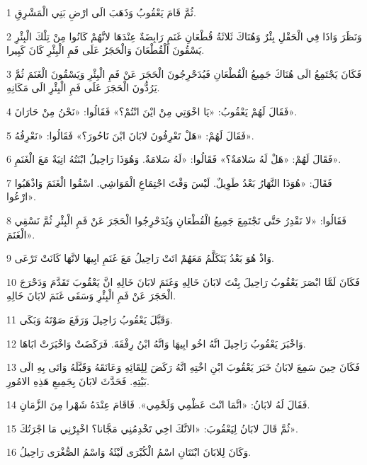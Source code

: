 \par 1 ثُمَّ قَامَ يَعْقُوبُ وَذَهَبَ الَى ارْضِ بَنِي الْمَشْرِقِ.
\par 2 وَنَظَرَ وَاذَا فِي الْحَقْلِ بِئْرٌ وَهُنَاكَ ثَلاثَةُ قُطْعَانِ غَنَمٍ رَابِضَةٌ عِنْدَهَا لانَّهُمْ كَانُوا مِنْ تِلْكَ الْبِئْرِ يَسْقُونَ الْقُطْعَانَ وَالْحَجَرُ عَلَى فَمِ الْبِئْرِ كَانَ كَبِيرا.
\par 3 فَكَانَ يَجْتَمِعُ الَى هُنَاكَ جَمِيعُ الْقُطْعَانِ فَيُدَحْرِجُونَ الْحَجَرَ عَنْ فَمِ الْبِئْرِ وَيَسْقُونَ الْغَنَمَ ثُمَّ يَرُدُّونَ الْحَجَرَ عَلَى فَمِ الْبِئْرِ الَى مَكَانِهِ.
\par 4 فَقَالَ لَهُمْ يَعْقُوبُ: «يَا اخْوَتِي مِنْ ايْنَ انْتُمْ؟» فَقَالُوا: «نَحْنُ مِنْ حَارَانَ».
\par 5 فَقَالَ لَهُمْ: «هَلْ تَعْرِفُونَ لابَانَ ابْنَ نَاحُورَ؟» فَقَالُوا: «نَعْرِفُهُ».
\par 6 فَقَالَ لَهُمْ: «هَلْ لَهُ سَلامَةٌ؟» فَقَالُوا: «لَهُ سَلامَةٌ. وَهُوَذَا رَاحِيلُ ابْنَتُهُ اتِيَةٌ مَعَ الْغَنَمِ».
\par 7 فَقَالَ: «هُوَذَا النَّهَارُ بَعْدُ طَوِيلٌ. لَيْسَ وَقْتَ اجْتِمَاعِ الْمَوَاشِي. اسْقُوا الْغَنَمَ وَاذْهَبُوا ارْعُوا».
\par 8 فَقَالُوا: «لا نَقْدِرُ حَتَّى تَجْتَمِعَ جَمِيعُ الْقُطْعَانِ وَيُدَحْرِجُوا الْحَجَرَ عَنْ فَمِ الْبِئْرِ ثُمَّ نَسْقِي الْغَنَمَ».
\par 9 وَاذْ هُوَ بَعْدُ يَتَكَلَّمُ مَعَهُمْ اتَتْ رَاحِيلُ مَعَ غَنَمِ ابِيهَا لانَّهَا كَانَتْ تَرْعَى.
\par 10 فَكَانَ لَمَّا ابْصَرَ يَعْقُوبُ رَاحِيلَ بِنْتَ لابَانَ خَالِهِ وَغَنَمَ لابَانَ خَالِهِ انَّ يَعْقُوبَ تَقَدَّمَ وَدَحْرَجَ الْحَجَرَ عَنْ فَمِ الْبِئْرِ وَسَقَى غَنَمَ لابَانَ خَالِهِ.
\par 11 وَقَبَّلَ يَعْقُوبُ رَاحِيلَ وَرَفَعَ صَوْتَهُ وَبَكَى.
\par 12 وَاخْبَرَ يَعْقُوبُ رَاحِيلَ انَّهُ اخُو ابِيهَا وَانَّهُ ابْنُ رِفْقَةَ. فَرَكَضَتْ وَاخْبَرَتْ ابَاهَا.
\par 13 فَكَانَ حِينَ سَمِعَ لابَانُ خَبَرَ يَعْقُوبَ ابْنِ اخْتِهِ انَّهُ رَكَضَ لِلِقَائِهِ وَعَانَقَهُ وَقَبَّلَهُ وَاتَى بِهِ الَى بَيْتِهِ. فَحَدَّثَ لابَانَ بِجَمِيعِ هَذِهِ الامُورِ.
\par 14 فَقَالَ لَهُ لابَانُ: «انَّمَا انْتَ عَظْمِي وَلَحْمِي». فَاقَامَ عِنْدَهُ شَهْرا مِنَ الزَّمَانِ.
\par 15 ثُمَّ قَالَ لابَانُ لِيَعْقُوبَ: «الانَّكَ اخِي تَخْدِمُنِي مَجَّانا؟ اخْبِرْنِي مَا اجْرَتُكَ».
\par 16 وَكَانَ لِلابَانَ ابْنَتَانِ اسْمُ الْكُبْرَى لَيْئَةُ وَاسْمُ الصُّغْرَى رَاحِيلُ.
